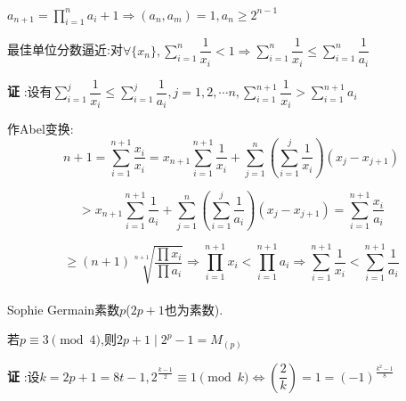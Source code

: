 $  a_{n+1}=\prod_{i=1}^{n}{a_i}+1\Rightarrow (a_n,a_m)=1,a_n\ge 2^{n-1}  $ 

最佳单位分数逼近:对$ \forall \{x_n\},\sum_{i=1}^{n}{\dfrac{1}{x_i}}<1\Rightarrow \sum_{i=1}^{n}{\dfrac{1}{x_i}}\le \sum_{i=1}^{n}{\dfrac{1}{a_i}}$

{\bf 证 }:设有$ \sum_{i=1}^{j}{\dfrac{1}{x_i}}\le \sum_{i=1}^{j}{\dfrac{1}{a_i}},j=1,2,\cdots n,\sum_{i=1}^{n+1}{\dfrac{1}{x_i}}> \sum_{i=1}^{n+1}{a_i}$

作Abel变换:\[  n+1=\sum_{i=1}^{n+1}{\dfrac{x_i}{x_i}}=x_{n+1}\sum_{i=1}^{n+1}{\dfrac{1}{x_i}}+\sum_{j=1}^{n}{(\sum_{i=1}^{j}{\dfrac{1}{x_i}})(x_j-x_{j+1})} \]

\[ > x_{n+1}\sum_{i=1}^{n+1}{\dfrac{1}{a_i}}+\sum_{j=1}^{n}{(\sum_{i=1}^{j}{\dfrac{1}{a_i}})(x_j-x_{j+1})}=\sum_{i=1}^{n+1}{\dfrac{x_i}{a_i}}\]

\[ \ge (n+1) \sqrt[n+1]{\dfrac{\prod{x_i}}{\prod{a_i}}}\Rightarrow \prod_{i=1}^{n+1}{x_i}<\prod_{i=1}^{n+1}{a_i}\Rightarrow \sum_{i=1}^{n+1}{\dfrac{1}{x_i}}<\sum_{i=1}^{n+1}{\dfrac{1}{a_i}}\] 
\\

Sophie Germain素数$ p$($ 2p+1$也为素数).

若$ p\equiv 3 \pmod 4$,则$ 2p+1 \mid 2^p-1=M_{(p)}$

{\bf 证 }:设$ k=2p+1=8t-1,2^{\frac{k-1}{2}}\equiv 1 \pmod k\Leftrightarrow (\dfrac{2}{k})=1=(-1)^{\frac{k^2-1}{8}}$
